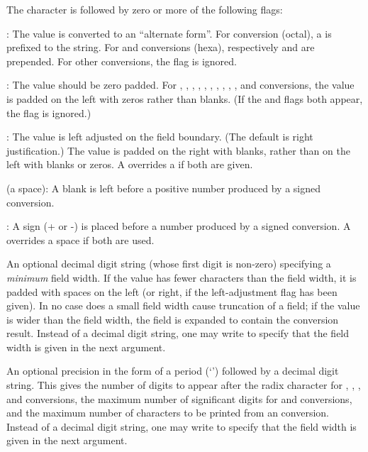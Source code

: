 { The character \kbd{\%} is followed by zero or
more of the following flags:

\item \kbd{\#}: The value is converted to an ``alternate form''. For
 conversion (octal), a  is prefixed to the string. For 
and  conversions (hexa), respectively  and  are
prepended. For other conversions, the flag is ignored.

\item {}: The value should be zero padded. For
,
,
,
,
,
,
,
,
,
, and
 conversions, the value is padded on the left with zeros rather than
blanks. (If the  and \kbd{-} flags both appear, the  flag is
ignored.)

\item \kbd{-}: The value is left adjusted on the field boundary. (The
default is right justification.) The value is padded on the right with
blanks, rather than on the left with blanks or zeros. A \kbd{-} overrides a
 if both are given.

\item {} (a space): A blank is left before a positive number
produced by a signed conversion.

\item \kbd{+}: A sign (+ or -) is placed before a number produced by a
signed conversion. A \kbd{+} overrides a space if both are used.

 An optional decimal digit string (whose first
digit is non-zero) specifying a \emph{minimum} field width. If the value has
fewer characters than the field width, it is padded with spaces on the left
(or right, if the left-adjustment flag has been given). In no case does a
small field width cause truncation of a field; if the value is wider than
the field width, the field is expanded to contain the conversion result.
Instead of a decimal digit string, one may write \kbd{*} to specify that the
field width is given in the next argument.

 An optional precision in the form of a period
(`') followed by a decimal digit string. This gives
the number of digits to appear after the radix character for ,
, , and  conversions, the maximum number of significant
digits for  and  conversions, and the maximum number of
characters to be printed from an  conversion.
Instead of a decimal digit string, one may write \kbd{*} to specify that the
field width is given in the next argument.

}
